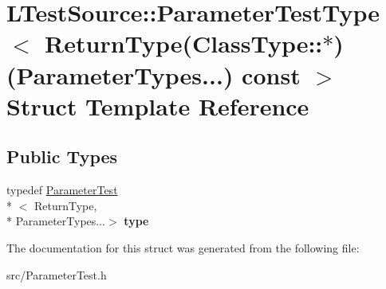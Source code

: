 \hypertarget{struct_l_test_source_1_1_parameter_test_type_3_01_return_type_07_class_type_1_1_5_08_07_parametedef9b7758f27f28c5d7555c68e2632b6}{\section{L\-Test\-Source\-:\-:Parameter\-Test\-Type$<$ Return\-Type(Class\-Type\-:\-:$\ast$)(Parameter\-Types...) const $>$ Struct Template Reference}
\label{struct_l_test_source_1_1_parameter_test_type_3_01_return_type_07_class_type_1_1_5_08_07_parametedef9b7758f27f28c5d7555c68e2632b6}
}
\subsection*{Public Types}
\begin{DoxyCompactItemize}
\item 
\hypertarget{struct_l_test_source_1_1_parameter_test_type_3_01_return_type_07_class_type_1_1_5_08_07_parametedef9b7758f27f28c5d7555c68e2632b6_ae48e4174bd71f53bbb263655fc7b11ad}{typedef \hyperlink{class_l_test_source_1_1_parameter_test}{Parameter\-Test}\\*
$<$ Return\-Type, \\*
Parameter\-Types...$>$ {\bfseries type}}\label{struct_l_test_source_1_1_parameter_test_type_3_01_return_type_07_class_type_1_1_5_08_07_parametedef9b7758f27f28c5d7555c68e2632b6_ae48e4174bd71f53bbb263655fc7b11ad}

\end{DoxyCompactItemize}


The documentation for this struct was generated from the following file\-:\begin{DoxyCompactItemize}
\item 
src/Parameter\-Test.\-h\end{DoxyCompactItemize}

